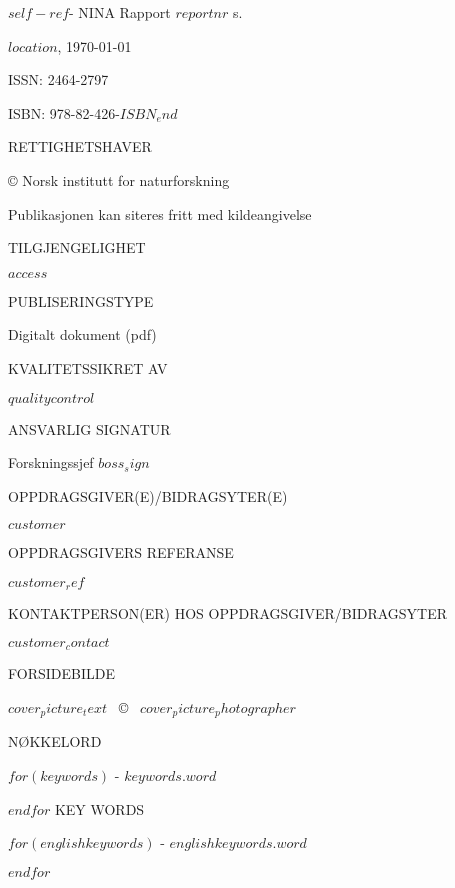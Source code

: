 \documentclass[11pt, a4paper]{article}
\newcommand{\smallspace}{\vspace{3mm}}
\begin{document}
\footnotesize{$self-ref$}- NINA Rapport $reportnr$ \pageref{LastPage} s. \par \smallspace
$location$, \ninadate\today \par \smallspace
ISSN: 2464-2797 \par
ISBN: 978-82-426-$ISBN_end$ \par  \smallspace
{\footnotesize{RETTIGHETSHAVER}} \par
© Norsk institutt for naturforskning  \par
Publikasjonen kan siteres fritt med kildeangivelse \par \smallspace
{\footnotesize{TILGJENGELIGHET}} \par
$access$ \par \smallspace
{\footnotesize{PUBLISERINGSTYPE}} \par
Digitalt dokument (pdf) \par \smallspace
{\footnotesize{KVALITETSSIKRET AV}} \par
$qualitycontrol$ \par \smallspace
{\footnotesize{ANSVARLIG SIGNATUR}} \par
Forskningssjef $boss_sign$ \par \smallspace
{\footnotesize{OPPDRAGSGIVER(E)/BIDRAGSYTER(E)}} \par
$customer$ \par \smallspace
{\footnotesize{OPPDRAGSGIVERS REFERANSE}} \par
$customer_ref$ \par \smallspace
{\footnotesize{KONTAKTPERSON(ER) HOS OPPDRAGSGIVER/BIDRAGSYTER}} \par
$customer_contact$ \par \smallspace
{\footnotesize{FORSIDEBILDE}} \par
$cover_picture_text$~ \copyright~ $cover_picture_photographer$ \par \smallspace
{\footnotesize{NØKKELORD}} \par\smallskip
$for(keywords)$
\small{\hyp{} $keywords.word$} \par
$endfor$
\vspace{5mm}
KEY WORDS \par\smallskip
$for(englishkeywords)$
\small{\hyp{} $englishkeywords.word$} \par
$endfor$

\vfill
\end{document}
